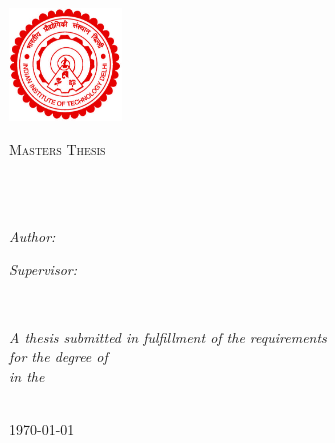 \documentclass[
12pt, %
english, 
onehalfspacing, %
headsepline, %
]{MastersDoctoralThesis} %
\author{Shadab Zafar}
\begin{document}
\frontmatter

\pagestyle{plain}


\begin{titlepage}
\begin{center}
\includegraphics[width=30mm,height=30mm]{figures/iitd-logo-large} 
\\
\vspace*{.06\textheight}
{\scshape\LARGE \univname\par}\vspace{1.5cm}
\textsc{\Large Masters Thesis}\\[0.5cm]

\HRule \\[0.4cm]
{\huge \bfseries \ttitle\par}\vspace{0.4cm}
\HRule \\[1.5cm]
 
\begin{minipage}[t]{0.4\textwidth}
\begin{flushleft} \large
\emph{Author:}\\
\authorname
\end{flushleft}
\end{minipage}
\begin{minipage}[t]{0.4\textwidth}
\begin{flushright} \large
\emph{Supervisor:} \\
\supname
\end{flushright}
\end{minipage}\\[3cm]
 
\vfill

\large \textit{A thesis submitted in fulfillment of the requirements\\ for the degree of \degreename}\\[0.3cm]
\textit{in the}\\[0.4cm]
\deptname\\[2cm]

\vfill

{\large \today}\\[4cm] %
\vfill

\end{center}
\end{titlepage}
\end{document}
